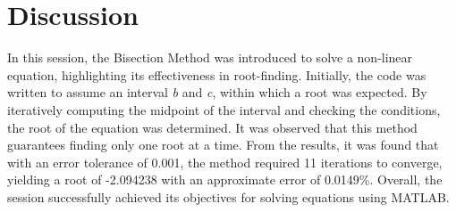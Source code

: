 \documentclass[a4paper,12pt]{article}
\begin{document}
	
	
	\section{Discussion}
	
	In this session, the Bisection Method was introduced to solve a non-linear equation, highlighting its effectiveness in root-finding. 
	Initially, the code was written to assume an interval \textit{b} and \textit{c}, within which a root was expected. By iteratively computing the midpoint of the interval and checking the conditions, the root of the equation was determined. It was observed that this method guarantees finding only one root at a time. From the results, it was found that with an error tolerance of 0.001, the method required 11 iterations to converge, yielding a root of -2.094238 with an approximate error of 0.0149\%. 
	Overall, the session successfully achieved its objectives for solving equations using MATLAB.
	

	
	
	
	
	
	
\end{document}
